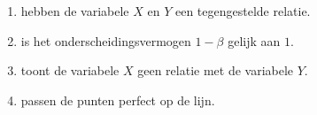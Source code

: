  
    \begin{enumerate}[label=(\alph*)]
        \item hebben de variabele $X$ en $Y$ een tegengestelde relatie.
        \item is het onderscheidingsvermogen $1 - \beta$ gelijk aan $1$.
        \item toont de variabele $X$ geen relatie met de variabele $Y$.
        \item passen de punten perfect op de lijn.
    \end{enumerate}

